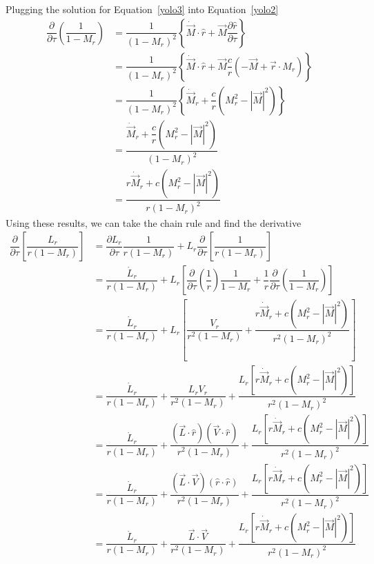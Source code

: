 \documentclass[onecolumn,10pt]{jhwhw}
\begin{document}
Plugging the solution for Equation~\ref{yolo3} into Equation~\ref{yolo2}
\begin{align*}
\dfrac{\partial}{\partial\tau} \left( \dfrac{1}{1 - M_r} \right)
&= \dfrac{1}{(1 - M_r)^2} \left \{ \dot{\vec{M}}\cdot\hat{r} + \vec{M} \dfrac{\partial\hat{r}}{\partial\tau} \right \} \\
&= \dfrac{1}{(1 - M_r)^2} \left \{ \dot{\vec{M}}\cdot\hat{r} + \vec{M} \dfrac{c}{r} \left( -\vec{M} + \vec{r} \cdot M_r \right) \right \} \\
&= \dfrac{1}{(1 - M_r)^2} \left \{ \dot{\vec{M}}_r +\dfrac{c}{r}\left( M_r^2 -|\vec{M}|^2  \right) \right \} \\
&= \dfrac{ \dot{\vec{M}}_r + \dfrac{c}{r} \left( M_r^2 -|\vec{M}|^2  \right) } {(1 - M_r)^2} \\
&= \dfrac{ r\dot{\vec{M}}_r + c \left( M_r^2 - |\vec{M}|^2 \right) } {r (1 - M_r)^2}
\end{align*}
Using these results, we can take the chain rule and find the derivative
\begin{align}
\dfrac{\partial}{\partial \tau} \left[ \dfrac{L_r}{r (1 - M_r)} \right]
& = \dfrac{\partial L_r}{\partial \tau} \dfrac{1}{r (1 - M_r)}
    + L_r\dfrac{\partial}{\partial \tau} \left[ \dfrac{1}{r (1 - M_r)} \right] \nonumber \\
& = \dfrac{\dot{L}_r}{r (1 - M_r)}
    + L_r \left[
    \dfrac{\partial}{\partial\tau} \left(\dfrac{1}{r}\right) \dfrac{1}{1 - M_r}
    + \dfrac{1}{r} \dfrac{\partial}{\partial\tau} \left(\dfrac{1}{1-M_r}\right)
    \right] \nonumber \\
& = \dfrac{\dot{L}_r}{r (1 - M_r)}
    + L_r \left[
    \dfrac{V_r}{r^2 (1 - M_r)}
    + \dfrac{ r\dot{\vec{M}}_r + c \left( M_r^2 - |\vec{M}|^2 \right) }
        {r^2 (1 - M_r)^2}
    \right] \nonumber \\
&= \dfrac{\dot{L}_r}{r (1 - M_r)}
    + \dfrac{L_r V_r}{r^2 (1 - M_r)}
    + \dfrac{ L_r \left[
        r\dot{\vec{M}}_r + c \left( M_r^2 - |\vec{M}|^2 \right) \right] }
        {r^2 (1 - M_r)^2} \nonumber \\
&= \dfrac{\dot{L}_r}{r (1 - M_r)}
    + \dfrac{(\vec{L}\cdot\hat{r}) (\vec{V}\cdot\hat{r})}{r^2 (1 - M_r)}
    + \dfrac{ L_r \left[
        r\dot{\vec{M}}_r + c \left( M_r^2 - |\vec{M}|^2 \right) \right] }
        {r^2 (1 - M_r)^2} \nonumber \\
&= \dfrac{\dot{L}_r}{r (1 - M_r)}
    + \dfrac{(\vec{L}\cdot\vec{V}) (\hat{r}\cdot\hat{r})}{r^2 (1 - M_r)}
    + \dfrac{ L_r \left[
        r\dot{\vec{M}}_r + c \left( M_r^2 - |\vec{M}|^2 \right) \right] }
        {r^2 (1 - M_r)^2} \nonumber \\
&= \dfrac{\dot{L}_r}{r (1 - M_r)}
    + \dfrac{\vec{L}\cdot\vec{V}}{r^2 (1 - M_r)}
    + \dfrac{ L_r \left[
        r\dot{\vec{M}}_r + c \left( M_r^2 - |\vec{M}|^2 \right) \right] }
        {r^2 (1 - M_r)^2} \label{yolo_swag}
\end{align}
\end{document}
